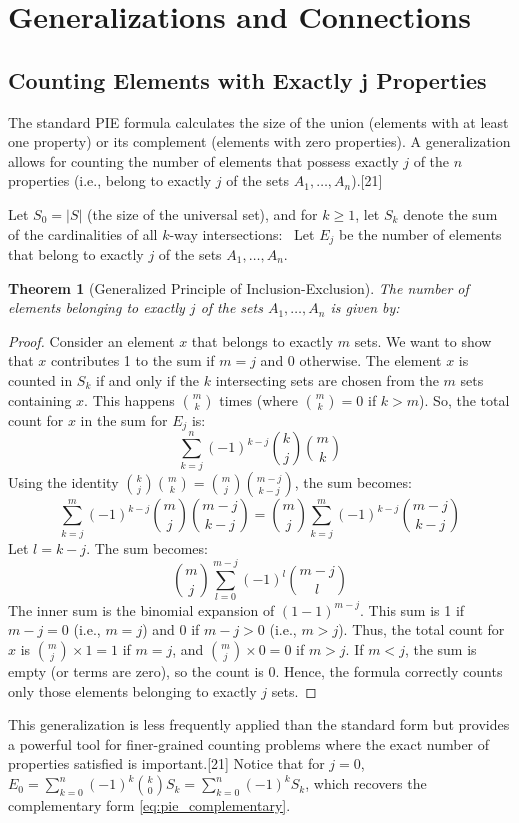 \documentclass[11pt]{amsart}
\theoremstyle{plain}
\newtheorem{theorem}{Theorem}[section]
\theoremstyle{definition}
\theoremstyle{remark}
\begin{document}
\section{Generalizations and Connections}

\subsection{Counting Elements with Exactly j Properties}
The standard PIE formula calculates the size of the union (elements with at least one property) or its complement (elements with zero properties). A generalization allows for counting the number of elements that possess exactly $j$ of the $n$ properties (i.e., belong to exactly $j$ of the sets $A_1, \ldots, A_n$).[21]

Let $S_0 = |S|$ (the size of the universal set), and for $k \ge 1$, let $S_k$ denote the sum of the cardinalities of all $k$-way intersections:
\
Let $E_j$ be the number of elements that belong to exactly $j$ of the sets $A_1, \ldots, A_n$.

\begin{theorem}[Generalized Principle of Inclusion-Exclusion]
The number of elements belonging to exactly $j$ of the sets $A_1, \ldots, A_n$ is given by:
\
\end{theorem}
\begin{proof}
Consider an element $x$ that belongs to exactly $m$ sets. We want to show that $x$ contributes 1 to the sum if $m=j$ and 0 otherwise.
The element $x$ is counted in $S_k$ if and only if the $k$ intersecting sets are chosen from the $m$ sets containing $x$. This happens $\binom{m}{k}$ times (where $\binom{m}{k}=0$ if $k>m$).
So, the total count for $x$ in the sum for $E_j$ is:
\[ \sum_{k=j}^n (-1)^{k-j} \binom{k}{j} \binom{m}{k} \]
Using the identity $\binom{k}{j}\binom{m}{k} = \binom{m}{j}\binom{m-j}{k-j}$, the sum becomes:
\[ \sum_{k=j}^m (-1)^{k-j} \binom{m}{j} \binom{m-j}{k-j} = \binom{m}{j} \sum_{k=j}^m (-1)^{k-j} \binom{m-j}{k-j} \]
Let $l = k-j$. The sum becomes:
\[ \binom{m}{j} \sum_{l=0}^{m-j} (-1)^{l} \binom{m-j}{l} \]
The inner sum is the binomial expansion of $(1-1)^{m-j}$. This sum is 1 if $m-j=0$ (i.e., $m=j$) and 0 if $m-j > 0$ (i.e., $m > j$).
Thus, the total count for $x$ is $\binom{m}{j} \times 1 = 1$ if $m=j$, and $\binom{m}{j} \times 0 = 0$ if $m > j$. If $m < j$, the sum is empty (or terms are zero), so the count is 0.
Hence, the formula correctly counts only those elements belonging to exactly $j$ sets.
\end{proof}
This generalization is less frequently applied than the standard form but provides a powerful tool for finer-grained counting problems where the exact number of properties satisfied is important.[21] Notice that for $j=0$, $E_0 = \sum_{k=0}^n (-1)^k \binom{k}{0} S_k = \sum_{k=0}^n (-1)^k S_k$, which recovers the complementary form \eqref{eq:pie_complementary}.
\end{document}

